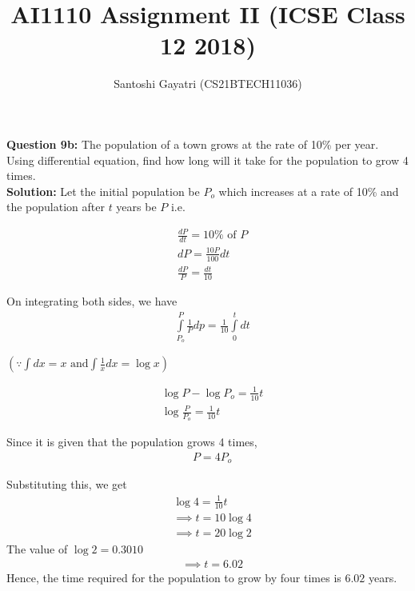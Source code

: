 \documentclass[journal,12pt,twocolumn]{IEEEtran}
\title{AI1110 Assignment II (ICSE Class 12 2018)}
\author{Santoshi Gayatri (CS21BTECH11036)}
\providecommand{\brak}[1]{\ensuremath{\left(#1\right)}}
\begin{document}
\maketitle

\textbf {Question 9b:}
The population of a town grows at the rate of 10\% per year. Using differential equation, find how long will it take for the population to grow 4 times.\\

\textbf{Solution:}
Let the initial population be $P_o$ which increases at a rate of 10\% and the population after $t$ years be $P$ i.e.

\begin{align}
& {\displaystyle \frac{dP}{dt} = 10\% \mbox{ of } P}\\[6pt]
& {dP =\displaystyle \frac{10P}{100}dt }\\[10pt]
& {\displaystyle \frac{dP}{P} = \frac{dt}{10}}
\end{align}

On integrating both sides, we have 
\begin{align}
& {\displaystyle { \int\limits_{P_o}^{P} \frac{1}{P} dp = \frac {1}{10} \int\limits_{0}^{t}dt}}
\end{align}


$ \brak{\because \int dx = x  \text{ and} \displaystyle\int \frac{1}{x}dx = \log x } $


\begin{align}
& {\log P - \log P_o = \frac{1}{10}t }\\
&{ \log \frac{P}{P_o} = \frac{1}{10}t }
\end{align}

Since it is given that the population grows 4 times, 
\begin{align}
&{P = 4P_o}
\end{align}

Substituting this, we get
\begin{align}
& {\log 4 =\displaystyle \frac {1}{10}t}\\[8pt]
& {\implies t= 10 \log 4 }\\[8pt]
& {\implies t = 20\log 2 }
\end{align}
The value of $\log 2 = 0.3010$
\begin{align}
& {\implies t = 6.02} 
\end{align}
Hence, the time required for the population to grow by four times is \underline{$6.02$} years.
\end{document}
